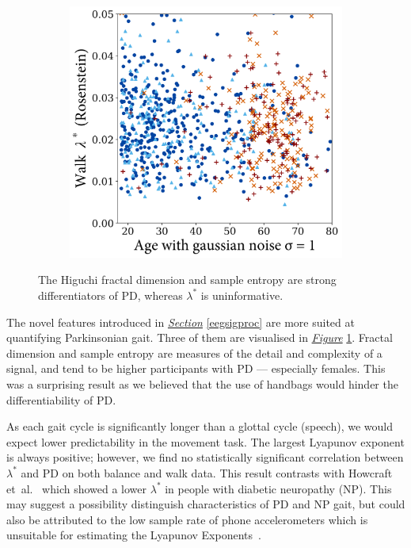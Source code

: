 \documentclass[12pt, twoside]{book}
\begin{document}
\begin{figure}[!htb]
{\begin{subfigure}{.4\textwidth}
		\end{subfigure}%
		\begin{subfigure}{.4\textwidth}
			\centering
			\includegraphics[width=0.96\linewidth]{walk_l1.png}
		\end{subfigure}%
	}
	\caption{The Higuchi fractal dimension and sample entropy are strong differentiators of PD, whereas $\lambda^*$ is uninformative.}
	\label{dynamicwalk}
\end{figure}

The novel features introduced in \textit{\hyperref[eegsigproc]{Section}} \ref{eegsigproc} are more suited at quantifying Parkinsonian gait. Three of them are visualised in \textit{\hyperref[dynamicwalk]{Figure}} \ref{dynamicwalk}. Fractal dimension and sample entropy are measures of the detail and complexity of a signal, and tend to be higher participants with PD --- especially females. This was a surprising result as we believed that the use of handbags would hinder the differentiability of PD.




As each gait cycle is significantly longer than a glottal cycle (speech), we would expect lower predictability in the movement task. The largest Lyapunov exponent is always positive; however, we find no statistically significant correlation between $\lambda^*$ and PD on both balance and walk data. This result contrasts with Howcraft et~al.~\cite{howcroft2014analysisgaitlyapunov} which showed a lower $\lambda^*$ in people with diabetic neuropathy (NP). This may suggest a possibility distinguish characteristics of PD and NP gait, but could also be attributed to the low sample rate of phone accelerometers which is unsuitable for estimating the Lyapunov Exponents~\cite{rosenstein1993practicallyapunov}. 
\end{document}
